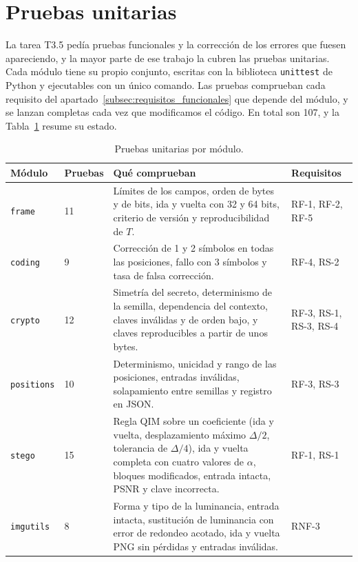 \documentclass[IB]{TFUOC}%
\begin{document}
\section{Pruebas unitarias}
\label{sec:pruebas}

La tarea T3.5 pedía pruebas funcionales y la corrección de los errores que fuesen apareciendo, y la mayor parte de ese trabajo la cubren las pruebas unitarias. Cada módulo tiene su propio conjunto, escritas con la biblioteca \texttt{unittest} de Python y ejecutables con un único comando. Las pruebas comprueban cada requisito del apartado~\ref{subsec:requisitos_funcionales} que depende del módulo, y se lanzan completas cada vez que modificamos el código. En total son 107, y la Tabla~\ref{tab:pruebas} resume su estado.

\begin{table}[H]
\centering
\scriptsize
\caption{Pruebas unitarias por módulo.}
\label{tab:pruebas}
\begin{tabular}{|p{2.2cm}|p{1.6cm}|p{6.4cm}|p{3.2cm}|}
\hline
\rowcolor{uocnavy}
\color{white}\textbf{Módulo} &
\color{white}\textbf{Pruebas} &
\color{white}\textbf{Qué comprueban} &
\color{white}\textbf{Requisitos} \\
\hline
\texttt{frame} & 11 & Límites de los campos, orden de bytes y de bits, ida y vuelta con 32 y 64 bits, criterio de versión y reproducibilidad de $T$. & RF-1, RF-2, RF-5 \\
\hline
\texttt{coding} & 9 & Corrección de 1 y 2 símbolos en todas las posiciones, fallo con 3 símbolos y tasa de falsa corrección. & RF-4, RS-2 \\
\hline
\texttt{crypto} & 12 & Simetría del secreto, determinismo de la semilla, dependencia del contexto, claves inválidas y de orden bajo, y claves reproducibles a partir de unos bytes. & RF-3, RS-1, RS-3, RS-4 \\
\hline
\texttt{positions} & 10 & Determinismo, unicidad y rango de las posiciones, entradas inválidas, solapamiento entre semillas y registro en JSON. & RF-3, RS-3 \\
\hline
\texttt{stego} & 15 & Regla QIM sobre un coeficiente (ida y vuelta, desplazamiento máximo $\Delta/2$, tolerancia de $\Delta/4$), ida y vuelta completa con cuatro valores de $\alpha$, bloques modificados, entrada intacta, PSNR y clave incorrecta. & RF-1, RS-1 \\
\hline
\texttt{imgutils} & 8 & Forma y tipo de la luminancia, entrada intacta, sustitución de luminancia con error de redondeo acotado, ida y vuelta PNG sin pérdidas y entradas inválidas. & RNF-3 \\

\end{tabular}
\end{table}
\end{document}
